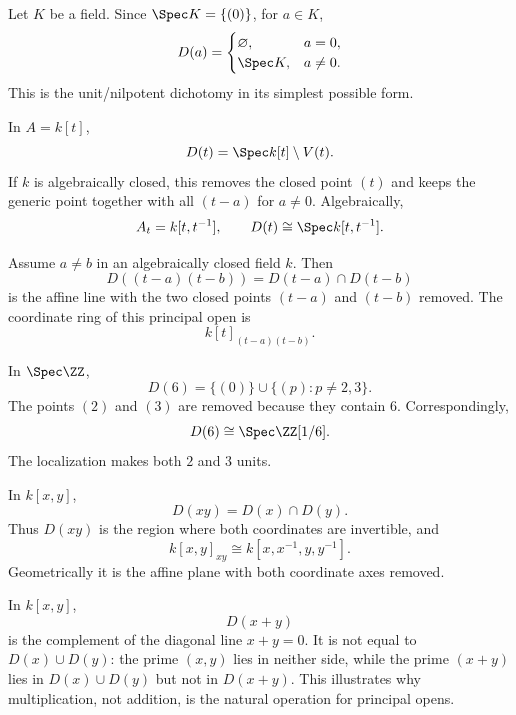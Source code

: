 \begin{example}[A field]
Let $K$ be a field.  Since $\Spec K=\{(0)\}$, for $a\in K$,
\[
D(a)=\begin{cases}
\varnothing,&a=0,\\
\Spec K,&a\neq0.
\end{cases}
\]
This is the unit/nilpotent dichotomy in its simplest possible form.
\end{example}

\begin{example}
In $A=k[t]$,
\[
D(t)=\Spec k[t]\setminus V(t).
\]
If $k$ is algebraically closed, this removes the closed point $(t)$ and keeps the generic
point together with all $(t-a)$ for $a\neq0$.  Algebraically,
\[
A_t=k[t,t^{-1}],
\qquad
D(t)\cong\Spec k[t,t^{-1}].
\]
\end{example}

\begin{example}
Assume $a\neq b$ in an algebraically closed field $k$.  Then
\[
D((t-a)(t-b))=D(t-a)\cap D(t-b)
\]
is the affine line with the two closed points $(t-a)$ and $(t-b)$ removed.  The coordinate
ring of this principal open is
\[
k[t]_{(t-a)(t-b)}.
\]
\end{example}

\begin{example}
In $\Spec\ZZ$,
\[
D(6)=\{(0)\}\cup\{(p):p\neq2,3\}.
\]
The points $(2)$ and $(3)$ are removed because they contain $6$.  Correspondingly,
\[
D(6)\cong\Spec\ZZ[1/6].
\]
The localization makes both $2$ and $3$ units.
\end{example}

\begin{example}
In $k[x,y]$,
\[
D(xy)=D(x)\cap D(y).
\]
Thus $D(xy)$ is the region where both coordinates are invertible, and
\[
k[x,y]_{xy}\cong k[x,x^{-1},y,y^{-1}].
\]
Geometrically it is the affine plane with both coordinate axes removed.
\end{example}

\begin{example}
In $k[x,y]$,
\[
D(x+y)
\]
is the complement of the diagonal line $x+y=0$.  It is not equal to
$D(x)\cup D(y)$: the prime $(x,y)$ lies in neither side, while the prime $(x+y)$ lies in
$D(x)\cup D(y)$ but not in $D(x+y)$.  This illustrates why multiplication, not addition,
is the natural operation for principal opens.
\end{example}

